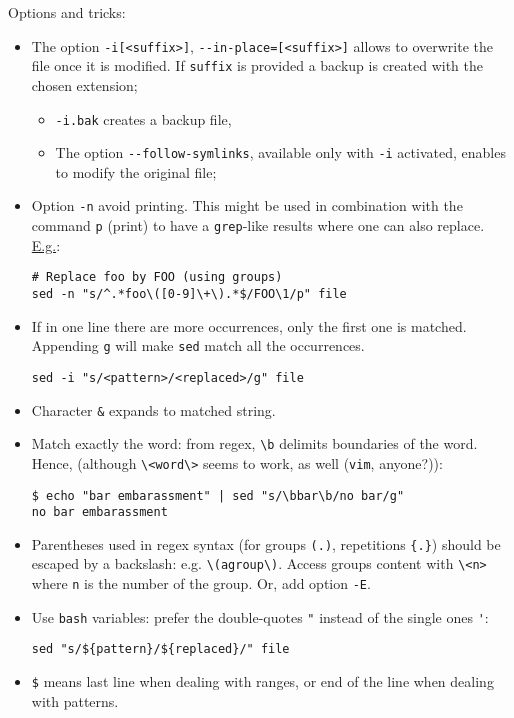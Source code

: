 \documentclass[a4paper,12pt,%
              final%
              ]{article}
\begin{document}
Options and tricks:
\begin{itemize}
  \item The option \verb|-i[<suffix>]|, \verb|--in-place=[<suffix>]| allows to overwrite the file once it is modified. If \verb|suffix| is provided a backup is created with the chosen extension;
    \begin{itemize}
      \item \verb|-i.bak| creates a backup file,
      \item The option \verb|--follow-symlinks|, available only with \verb|-i| activated, enables to modify the original file;
    \end{itemize}
  \item Option \verb|-n| avoid printing. This might be used in combination with the command \texttt{p} (print) to have a \texttt{grep}-like results where one can also replace. \href{https://unix.stackexchange.com/a/278377}{E.g.}:
\begin{verbatim}
# Replace foo by FOO (using groups)
sed -n "s/^.*foo\([0-9]\+\).*$/FOO\1/p" file
\end{verbatim}
  \item If in one line there are more occurrences, only the first one is matched. Appending \texttt{g} will make \texttt{sed} match all the occurrences.
\begin{verbatim}
sed -i "s/<pattern>/<replaced>/g" file
\end{verbatim}
  \item Character \verb|&| expands to matched string.
  \item Match exactly the word: from regex, \verb|\b| delimits boundaries of the word. Hence, (although \verb|\<word\>| seems to work, as well (\texttt{vim}, anyone?)):
\begin{verbatim}
$ echo "bar embarassment" | sed "s/\bbar\b/no bar/g"
no bar embarassment
\end{verbatim}
  \item Parentheses used in regex syntax (for groups \verb|(.)|, repetitions \verb|{.}|) should be escaped by a backslash: e.g. \verb|\(agroup\)|. Access groups content with \verb|\<n>| where \verb|n| is the number of the group. Or, add option \verb|-E|.
  \item Use \texttt{bash} variables: prefer the double-quotes \verb|"| instead of the single ones \verb|'|:
\begin{verbatim}
sed "s/${pattern}/${replaced}/" file
\end{verbatim}
  \item \verb|$| means last line when dealing with ranges, or end of the line when dealing with patterns.

\end{itemize}
\end{document}

